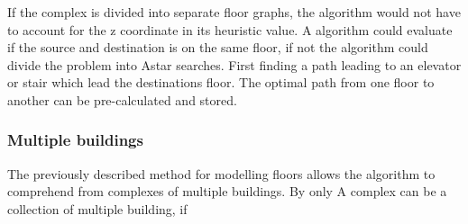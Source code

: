 
If the complex is divided into separate floor graphs, the algorithm would not have to account for the z coordinate in its heuristic value. A algorithm could evaluate if the source and destination is on the same floor, if not the algorithm could divide the problem into Astar searches. First finding a path leading to an elevator or stair which lead the destinations floor. The optimal path from one floor to another can be pre-calculated and stored. 


\subsubsection{Multiple buildings}

The previously described method for modelling floors allows the algorithm to comprehend from complexes of multiple buildings. By only  
A complex can be a collection of multiple building, if  
